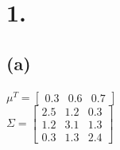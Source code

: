 \documentclass{article}
\begin{document}
\thispagestyle{firstpageheader}


\section*{1.}

{\Large 

\subsection*{(a)}

$\mu^T = 
\begin{bmatrix}
  0.3 & 0.6 & 0.7
\end{bmatrix}$ \\
$ \Sigma = 
\begin{bmatrix}
2.5 & 1.2 & 0.3 \\
1.2 & 3.1 & 1.3 \\
0.3 & 1.3 & 2.4
\end{bmatrix}$ \\ 

}
\end{document}
